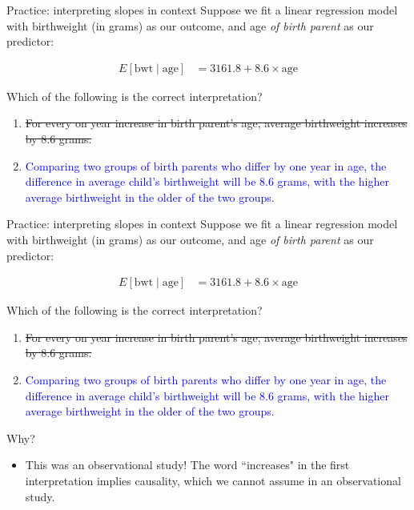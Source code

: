 \documentclass[10pt,t]{beamer}
\begin{document}
\begin{frame}{Practice: interpreting slopes in context}
Suppose we fit a linear regression model with birthweight (in grams) as our outcome, and age \textit{of birth parent} as our predictor:

\begin{align*}
E[\text{bwt} \mid \text{age}] & = 3161.8 + 8.6 \times \text{age}
\end{align*}

Which of the following is the correct interpretation?

\begin{enumerate}
	\item \sout{For every on year increase in birth parent's age, average birthweight increases by 8.6 grams.}
	\item \textcolor{blue}{Comparing two groups of birth parents who differ by one year in age, the difference in average child's birthweight will be 8.6 grams, with the higher average birthweight in the older of the two groups.}
\end{enumerate}


\end{frame}

\begin{frame}{Practice: interpreting slopes in context}
Suppose we fit a linear regression model with birthweight (in grams) as our outcome, and age \textit{of birth parent} as our predictor:

\begin{align*}
E[\text{bwt} \mid \text{age}] & = 3161.8 + 8.6 \times \text{age}
\end{align*}

Which of the following is the correct interpretation?

\begin{enumerate}
	\item \sout{For every on year increase in birth parent's age, average birthweight increases by 8.6 grams.}
	\item \textcolor{blue}{Comparing two groups of birth parents who differ by one year in age, the difference in average child's birthweight will be 8.6 grams, with the higher average birthweight in the older of the two groups.}
\end{enumerate}

Why?
\begin{itemize}
	\item[] This was an observational study! The word ``increases" in the first interpretation implies causality, which we cannot assume in an observational study.
\end{itemize}

\end{frame}
\end{document}
